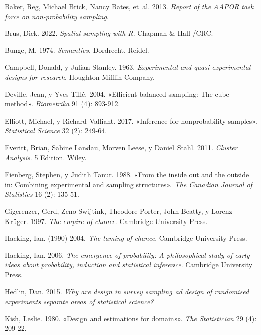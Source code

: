 \documentclass[
  spanish,
  a4paper,
]{scrreprt}
\newlength{\cslhangindent}
\newenvironment{CSLReferences}[2] %
 {\begin{list}{}{%
  \setlength{\itemindent}{0pt}
  \setlength{\leftmargin}{0pt}
  \setlength{\parsep}{0pt}
  \ifodd #1
   \setlength{\leftmargin}{\cslhangindent}
   \setlength{\itemindent}{-1\cslhangindent}
  \fi
  \setlength{\itemsep}{#2\baselineskip}}}
 {\end{list}}
\begin{document}
\protect{}\label{refs}
\begin{CSLReferences}{1}{1}
Baker, Reg, Michael Brick, Nancy Bates, et~al. 2013. \emph{Report of the
AAPOR task force on non-probability sampling}.

Brus, Dick. 2022. \emph{Spatial sampling with R}. Chapman \& Hall /CRC.

Bunge, M. 1974. \emph{Semantics}. Dordrecht. Reidel.

Campbell, Donald, y Julian Stanley. 1963. \emph{Experimental and
quasi-experimental designs for research}. Houghton Mifflin Company.

Deville, Jean, y Yves Tillé. 2004. {«Efficient balanced sampling: The
cube method»}. \emph{Biometrika} 91 (4): 893-912.

Elliott, Michael, y Richard Valliant. 2017. {«Inference for
nonprobability samples»}. \emph{Statistical Science} 32 (2): 249-64.

Everitt, Brian, Sabine Landau, Morven Leese, y Daniel Stahl. 2011.
\emph{Cluster Analysis}. 5 Edition. Wiley.

Fienberg, Stephen, y Judith Tanur. 1988. {«From the inside out and the
outside in: Combining experimental and sampling structures»}. \emph{The
Canadian Journal of Statistics} 16 (2): 135-51.

Gigerenzer, Gerd, Zeno Swijtink, Theodore Porter, John Beatty, y Lorenz
Krüger. 1997. \emph{The empire of chance}. Cambridge University Press.

Hacking, Ian. (1990) 2004. \emph{The taming of chance}. Cambridge
University Press.

Hacking, Ian. 2006. \emph{The emergence of probability: A philosophical
study of early ideas about probability, induction and statistical
inference}. Cambridge University Press.

Hedlin, Dan. 2015. \emph{Why are design in survey sampling ad design of
randomised experiments separate areas of statistical science?}

Kish, Leslie. 1980. {«Design and estimations for domains»}. \emph{The
Statistician} 29 (4): 209-22.


\end{CSLReferences}
\end{document}
